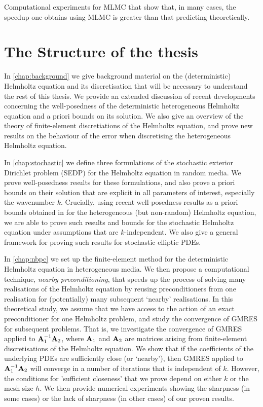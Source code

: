 \item Computational experiments for MLMC that show that, in many cases, the speedup one obtains using MLMC is greater than that predicting theoretically.
\een


\section{The Structure of the thesis}

In \cref{chap:background} we give background material on the (deterministic) Helmholtz equation and its discretisation that will be necessary to understand the rest of this thesis. We provide an extended discussion of recent developments concerning the well-posedness of the deterministic heterogeneous Helmholtz equation and a priori bounds on its solution. We also give an overview of the theory of finite-element discretiations of the Helmholtz equation, and prove new results on the behaviour of the error when discretising the heterogeneous Helmholtz equation.

In \cref{chap:stochastic} we define three formulations of the stochastic exterior Dirichlet problem (SEDP) for the Helmholtz equation in random media. We prove well-posedness results for these formulations, and also prove a priori bounds on their solution that are explicit in all parameters of interest, especially the wavenumber $k.$ Crucially, using recent well-posedness results as a priori bounds obtained in \cite{GrPeSp:18} for the heterogeneous (but non-random) Helmholtz equation, we are able to prove such results and bounds for the stochastic Helmholtz equation under assumptions that are $k$-independent. We also give a general framework for proving such results for stochastic elliptic PDEs.

In \cref{chap:nbpc} we set up the finite-element method for the deterministic Helmholtz equation in heterogeneous media. We then propose a computational technique, \emph{nearby preconditioning}, that speeds up the process of solving many realisations of the Helmholtz equation by reusing preconditioners from one realisation for (potentially) many subsequent `nearby' realisations. In this theoretical study, we assume that we have access to the action of an exact preconditioner for one Helmholtz problem, and study the convergence of GMRES for subsequent problems. That is, we investigate the convergence of GMRES applied to $\mathbf{A}_{1}^{-1}\mathbf{A}_{2}$, where $\mathbf{A}_{1}$ and $\mathbf{A}_{2}$ are matrices arising from finite-element discretisations of the Helmholtz equation. We show that if the coefficients of the underlying PDEs are sufficiently close (or `nearby'), then GMRES applied to $\mathbf{A}_{1}^{-1}\mathbf{A}_{2}$ will converge in a number of iterations that is independent of $k.$ However, the conditions for 'sufficient closeness' that we prove depend on either $k$ or the mesh size $h$. We then provide numerical experiments showing the sharpness (in some cases) or the lack of sharpness (in other cases) of our proven results.

